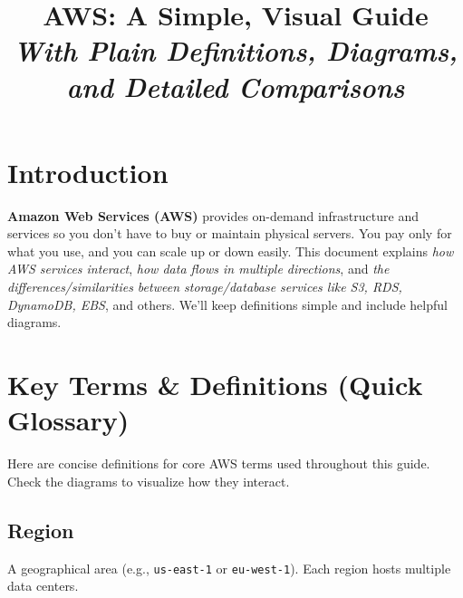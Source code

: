 \documentclass[12pt]{article}
\title{
    \vspace{-2cm}
    \textbf{\color{mainDark}\Huge AWS: A Simple, Visual Guide}\\
    \vspace{0.2cm}
    \large \textit{With Plain Definitions, Diagrams, and Detailed Comparisons}
}
\author{}
\date{}
\begin{document}
\maketitle
\vspace{-1cm}

\section*{Introduction}
\justifying
\textbf{Amazon Web Services (AWS)} provides on-demand infrastructure and services so you don't have to buy or maintain physical servers. You pay only for what you use, and you can scale up or down easily. This document explains \textit{how AWS services interact}, \textit{how data flows in multiple directions}, and \textit{the differences/similarities between storage/database services like S3, RDS, DynamoDB, EBS}, and others. We'll keep definitions simple and include helpful diagrams.

\begin{center}
\end{center}

\clearpage

\section{Key Terms \& Definitions (Quick Glossary)}
\justifying
Here are concise definitions for core AWS terms used throughout this guide. Check the diagrams to visualize how they interact.

\subsection*{Region}
A geographical area (e.g., \texttt{us-east-1} or \texttt{eu-west-1}). Each region hosts multiple data centers.
\end{document}
